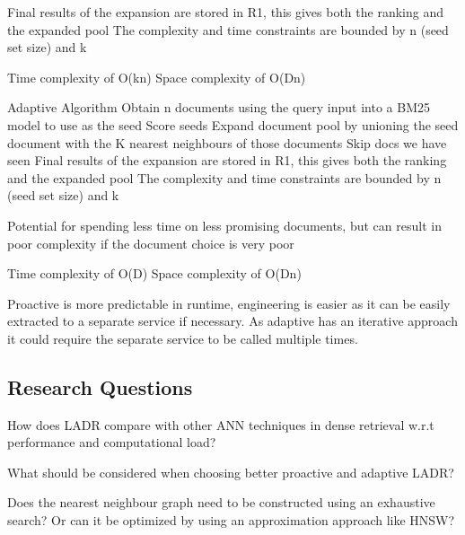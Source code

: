\documentclass[sigconf,authorversion,nonacm]{acmart}
\begin{document}
Final results of the expansion are stored in R1, this gives both the ranking and the expanded pool
The complexity and time constraints are bounded by n (seed set size) and k

Time complexity of O(kn) Space complexity of O(Dn)


Adaptive Algorithm Obtain n documents using the query input into a BM25 model to use as the seed
Score seeds Expand document pool by unioning the seed document with the K nearest neighbours of
those documents Skip docs we have seen Final results of the expansion are stored in R1, this gives
both the ranking and the expanded pool The complexity and time constraints are bounded by n (seed
set size) and k

Potential for spending less time on less promising documents, but can result in poor complexity if
the document choice is very poor

Time complexity of O(D) Space complexity of O(Dn)

Proactive is more predictable in runtime, engineering is easier as it can be easily extracted to a
separate service if necessary. As adaptive has an iterative approach it could require the separate
service to be called multiple times.
\subsection{Research Questions}

How does LADR compare with other ANN techniques in dense retrieval w.r.t performance and
computational load?

What should be considered when choosing better proactive and adaptive LADR?

Does the nearest neighbour graph need to be constructed using an exhaustive search? Or can it be
optimized by using an approximation approach like HNSW?

\end{document}
